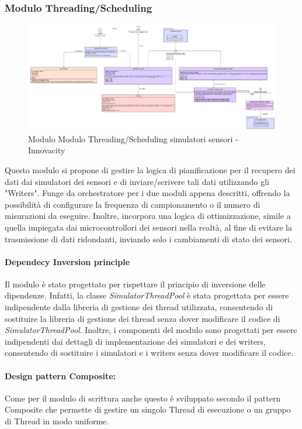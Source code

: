 \begin{itemize}
\subsubsection{Modulo Threading/Scheduling}
\begin{figure}[H]
    \centering
    \includegraphics[width=1.1\textwidth]{../Images/SpecificaTecnica/simulatorThread.PNG}
    \caption{Modulo Modulo Threading/Scheduling simulatori sensori - Innovacity}
    \label{fig: Modulo_simulatori_sensori_thread}
\end{figure}
Questo modulo si propone di gestire la logica di pianificazione per il recupero dei dati dai simulatori dei sensori e di inviare/scrivere tali dati utilizzando gli "Writers". Funge da orchestratore per i due moduli appena descritti, offrendo la possibilità di configurare la frequenza di campionamento o il numero di misurazioni da eseguire. Inoltre, incorpora una logica di ottimizzazione, simile a quella impiegata dai microcontrollori dei sensori nella realtà, al fine di evitare la trasmissione di dati ridondanti, inviando solo i cambiamenti di stato dei sensori.

\paragraph*{Dependecy Inversion principle}
Il modulo è stato progettato per rispettare il principio di inversione delle dipendenze. Infatti, la classe \textit{SimulatorThreadPool} è stata progettata per essere indipendente dalla libreria di gestione dei thread utilizzata, consentendo di sostituire la libreria di gestione dei thread senza dover modificare il codice di \textit{SimulatorThreadPool}.
Inoltre, i componenti del modulo sono progettati per essere indipendenti dai dettagli di implementazione dei simulatori e dei writers, consentendo di sostituire i simulatori e i writers senza dover modificare il codice.

\paragraph{Design pattern Composite:}
Come per il modulo di scrittura anche questo è sviluppato secondo il pattern Composite che permette di gestire un singolo Thread di esecuzione o un gruppo di Thread in modo uniforme.

\end{itemize}
